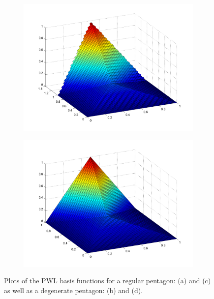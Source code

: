 \begin{figure}
\begin{subfigure}[b]{0.48\textwidth}
		\includegraphics[width=\textwidth]{figures/sec_BF/PWL_rpent_plot_E.png}
		\caption{}
	\end{subfigure}
	\hfill
	\begin{subfigure}[b]{0.48\textwidth}
		\centering
		\includegraphics[width=\textwidth]{figures/sec_BF/PWL_dpent_plot_E.png}
		\caption{}
	\end{subfigure}
\caption{Plots of the PWL basis functions for a regular pentagon: (a) and (c) as well as a degenerate pentagon: (b) and (d).}
\end{figure}



